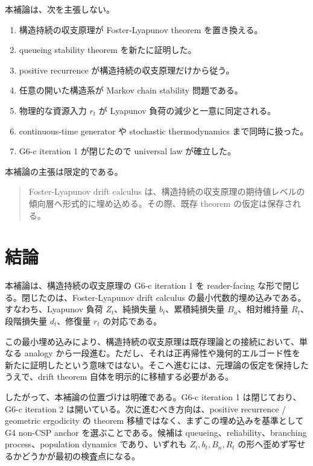 \documentclass[12pt,a4paper]{article}
\begin{document}
本補論は、次を主張しない。

\begin{enumerate}
\def\labelenumi{\arabic{enumi}.}
\tightlist
\item
  構造持続の収支原理が Foster-Lyapunov theorem を置き換える。
\item
  queueing stability theorem を新たに証明した。
\item
  positive recurrence が構造持続の収支原理だけから従う。
\item
  任意の開いた構造系が Markov chain stability 問題である。
\item
  物理的な資源入力 \(r_{t}\) が Lyapunov 負荷の減少と一意に同定される。
\item
  continuous-time generator や stochastic thermodynamics まで同時に扱った。
\item
  G6-c iteration 1 が閉じたので universal law が確立した。
\end{enumerate}

本補論の主張は限定的である。

\begin{quote}
Foster-Lyapunov drift calculus は、構造持続の収支原理の期待値レベルの傾向層へ形式的に埋め込める。その際、既存 theorem の仮定は保存される。
\end{quote}

\section{結論}\label{ux7d50ux8ad6}

本補論は、構造持続の収支原理の G6-c iteration 1 を reader-facing な形で閉じる。閉じたのは、Foster-Lyapunov drift calculus の最小代数的埋め込みである。すなわち、Lyapunov 負荷 \(Z_{t}\)、純損失量 \(b_{t}\)、累積純損失量 \(B_{n}\)、相対維持量 \(R_{t}\)、段階損失量 \(d_{t}\)、修復量 \(r_{t}\) の対応である。

この最小埋め込みにより、構造持続の収支原理は既存理論との接続において、単なる analogy から一段進む。ただし、それは正再帰性や幾何的エルゴード性を新たに証明したという意味ではない。そこへ進むには、元理論の仮定を保持したうえで、drift theorem 自体を明示的に移植する必要がある。

したがって、本補論の位置づけは明確である。G6-c iteration 1 は閉じており、G6-c iteration 2 は開いている。次に進むべき方向は、positive recurrence / geometric ergodicity の theorem 移植ではなく、まずこの埋め込みを基準として G4 non-CSP anchor を選ぶことである。候補は queueing、reliability、branching process、population dynamics であり、いずれも \(Z_{t},b_{t},B_{n},R_{t}\) の形へ歪めず写せるかどうかが最初の検査点になる。
\end{document}
